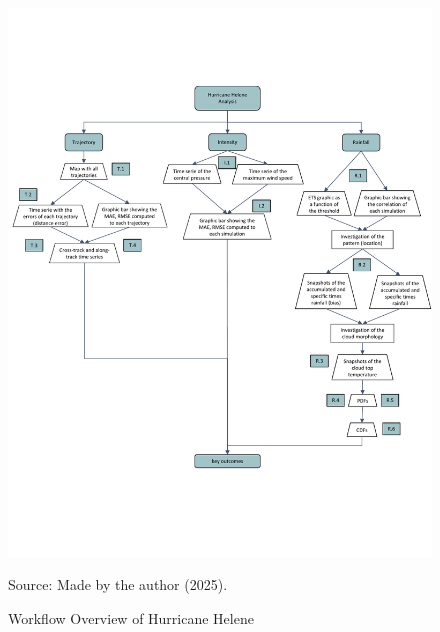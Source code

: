 \begin{figure}[p]
	\centering
	\caption{Workflow Overview of Hurricane Helene}
	\label{fig:workflow}\includegraphics[width=\textwidth,height=\textheight,keepaspectratio]{docs/figuras/chapter4/HELENE_workflow_02.pdf}
	
	\vspace{0.5em}
	
	\centering
	Source: Made by the author (2025).
\end{figure}




